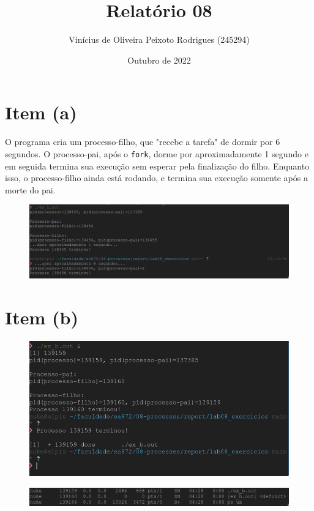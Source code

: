 \documentclass{article}
\title{Relatório 08}
\author{Vinícius de Oliveira Peixoto Rodrigues (245294)}
\date{Outubro de 2022}
\begin{document}
\maketitle

\section*{Item (a)}

O programa cria um processo-filho, que "recebe a tarefa" de dormir por 6 segundos. O processo-pai, após o \texttt{fork}, dorme por aproximadamente 1 segundo e em seguida termina sua execução sem esperar pela finalização do filho. Enquanto isso, o processo-filho ainda está rodando, e termina sua execução somente após a morte do pai.

\begin{figure}[!ht]
    \begin{center}
        \includegraphics[width=\textwidth]{images/item_a.png}
    \end{center}
\end{figure} 
\FloatBarrier

\section*{Item (b)}

\begin{figure}[!ht]
    \begin{center}
        \includegraphics[width=\textwidth]{images/item_b1.png}
    \end{center}
\end{figure} 
\FloatBarrier
\begin{figure}[!ht]
    \begin{center}
        \includegraphics[width=\textwidth]{images/item_b2.png}
    \end{center}
\end{figure} 
\FloatBarrier
\end{document}

